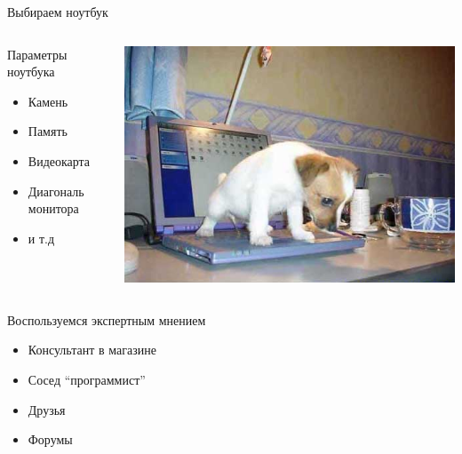 \documentclass[10pt]{beamer}
\begin{document}
\begin{frame}{Выбираем ноутбук}

\begin{columns}[C]
        \centering
        \begin{column}{.5\textwidth}
                \begin{block}{Параметры ноутбука}
                \begin{itemize}
                    \item Камень
                    \item Память
                    \item Видеокарта
                    \item Диагональ монитора
                    \item и т.д
                \end{itemize}
                \end{block}
        \end{column}%
        \begin{column}{.5\textwidth}
                \begin{center}
                    \includegraphics[scale=0.3]{images/book.jpg}
                \end{center}
        \end{column}
\end{columns}

\begin{block}{Воспользуемся экспертным мнением}
\begin{itemize}
    \item Консультант в магазине
    \item Сосед ``программист''
    \item Друзья
    \item Форумы
\end{itemize}
\end{block}

\end{frame}
\end{document}
